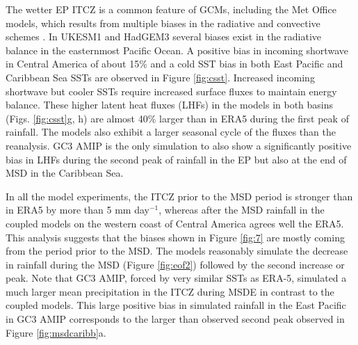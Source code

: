 The wetter EP ITCZ is a common feature of GCMs, including the Met Office models, which results from multiple biases in the radiative and convective schemes \citep{oueslati2013,li2014}. %
 In UKESM1 and HadGEM3 several biases exist in the radiative balance in the easternmost Pacific Ocean. A positive bias in incoming shortwave in Central America of about 15\% and a cold SST bias in both East Pacific and Caribbean Sea SSTs are observed in Figure \ref{fig:csst}. Increased incoming shortwave but cooler SSTs require increased surface fluxes to maintain energy balance. These higher latent heat fluxes (LHFs) in the models in both basins (Figs. \ref{fig:csst}g, h) are almost 40\% larger than in ERA5 during the first peak of rainfall. The models also exhibit a larger seasonal cycle of the fluxes than the reanalysis. GC3 AMIP is the only simulation to also show a significantly positive bias in LHFs during the second peak of rainfall in the EP but also at the end of MSD in the Caribbean Sea. 


In all the model experiments, the ITCZ prior to the MSD period is stronger than in ERA5 by more than 5 mm day$^{-1}$, whereas after the MSD rainfall in the coupled models on the western coast of Central America agrees well the ERA5. 
This analysis suggests that the biases shown in Figure \ref{fig:7} are mostly coming from the period prior to the MSD. The models reasonably simulate the decrease in rainfall during the MSD (Figure \ref{fig:eof2}) followed by the second increase or peak. 
Note that GC3 AMIP, forced by very similar SSTs as ERA-5, simulated a much larger mean precipitation in the ITCZ during MSDE in contrast to the coupled models. This large positive bias in simulated rainfall in the East Pacific in GC3 AMIP corresponds to the larger than observed second peak observed in Figure \ref{fig:msdcaribb}a. 





